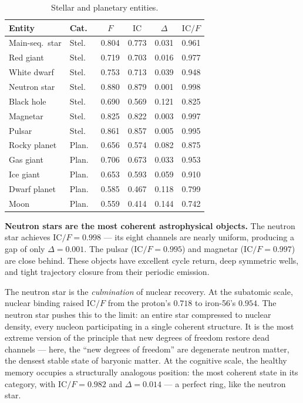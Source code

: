 \documentclass[
  aps,
  prd,
  twocolumn,
  superscriptaddress,
  nofootinbib,
  floatfix
]{revtex4-2}
\newcommand{\IC}{\mathrm{IC}}
\begin{document}
\begin{table}[htbp]
\caption{\label{tab:stellar}Stellar and planetary entities.}
\begin{ruledtabular}
\begin{tabular}{llcccc}
Entity & Cat.\ & $F$ & $\IC$ & $\Delta$ & $\IC/F$ \\
\hline
Main-seq.\ star   & Stel.\ & 0.804 & 0.773 & 0.031 & 0.961 \\
Red giant          & Stel.\ & 0.719 & 0.703 & 0.016 & 0.977 \\
White dwarf        & Stel.\ & 0.753 & 0.713 & 0.039 & 0.948 \\
Neutron star       & Stel.\ & 0.880 & 0.879 & 0.001 & 0.998 \\
Black hole         & Stel.\ & 0.690 & 0.569 & 0.121 & 0.825 \\
Magnetar           & Stel.\ & 0.825 & 0.822 & 0.003 & 0.997 \\
Pulsar             & Stel.\ & 0.861 & 0.857 & 0.005 & 0.995 \\
\hline
Rocky planet       & Plan.\ & 0.656 & 0.574 & 0.082 & 0.875 \\
Gas giant          & Plan.\ & 0.706 & 0.673 & 0.033 & 0.953 \\
Ice giant          & Plan.\ & 0.653 & 0.593 & 0.059 & 0.910 \\
Dwarf planet       & Plan.\ & 0.585 & 0.467 & 0.118 & 0.799 \\
Moon               & Plan.\ & 0.559 & 0.414 & 0.144 & 0.742 \\
\end{tabular}
\end{ruledtabular}
\end{table}

\textbf{Neutron stars are the most coherent astrophysical
objects.}
The neutron star achieves $\IC/F = 0.998$ --- its eight
channels are nearly uniform, producing a gap of only
$\Delta = 0.001$.  The pulsar ($\IC/F = 0.995$) and magnetar
($\IC/F = 0.997$) are close behind.  These objects have
excellent cycle return, deep symmetric wells, and tight
trajectory closure from their periodic emission.

The neutron star is the \emph{culmination} of nuclear
recovery.  At the subatomic scale, nuclear binding raised
$\IC/F$ from the proton's $0.718$ to iron-56's $0.954$.
The neutron star pushes this to the limit: an entire star
compressed to nuclear density, every nucleon participating
in a single coherent structure.  It is the most extreme
version of the principle that new degrees of freedom restore
dead channels --- here, the ``new degrees of freedom'' are
degenerate neutron matter, the densest stable state of baryonic
matter.  At the cognitive scale, the healthy memory
occupies a structurally analogous position: the most
coherent state in its category, with $\IC/F = 0.982$ and
$\Delta = 0.014$ --- a perfect ring, like the neutron star.
\end{document}
